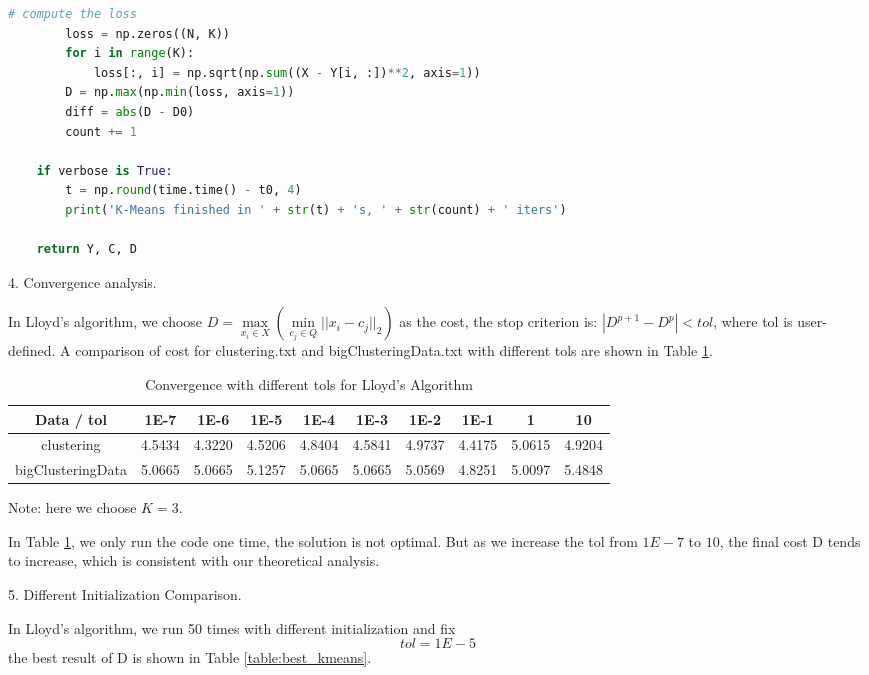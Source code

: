 \begin{description}
\begin{description}
\begin{lstlisting}[language=Python, caption={K-Means Algorithm Python Code}]
        # compute the loss
        loss = np.zeros((N, K))
        for i in range(K):
            loss[:, i] = np.sqrt(np.sum((X - Y[i, :])**2, axis=1))
        D = np.max(np.min(loss, axis=1))
        diff = abs(D - D0)
        count += 1

    if verbose is True:
        t = np.round(time.time() - t0, 4)
        print('K-Means finished in ' + str(t) + 's, ' + str(count) + ' iters')

    return Y, C, D
\end{lstlisting}

\item{4.} Convergence analysis.

In Lloyd's algorithm, we choose $D = \underset{x_i \in X}{\max}( \underset{c_j \in Q}{\min}{||x_i - c_j||_2})$ as the cost, the stop criterion is: $|D^{p+1} - D^{p}| < tol$, where tol is user-defined. A comparison of cost for clustering.txt and bigClusteringData.txt with different tols are shown in Table \ref{table:tol}.

\begin{table}[H]
	\centering
	\caption{Convergence with different tols for Lloyd's Algorithm}
	\label{table:tol}	
	\begin{tabular}{ c | c | c | c | c | c | c | c | c | c}
		\hline \hline
		Data / tol   & 1E-7    & 1E-6    & 1E-5     & 1E-4    & 1E-3    & 1E-2    & 1E-1    & 1    & 10 \\[0.1cm]
		\hline
	clustering	       & 4.5434 & 4.3220    & 4.5206    & 4.8404    & 4.5841    & 4.9737 & 4.4175 & 5.0615 & 4.9204 \\[0.1cm]
bigClusteringData & 5.0665 & 5.0665    & 5.1257    & 5.0665    & 5.0665    & 5.0569 & 4.8251 & 5.0097 & 5.4848 \\[0.1cm]
		\hline	
	\end{tabular}
\end{table}
Note: here we choose $K = 3$.

In Table \ref{table:tol}, we only run the code one time, the solution is not optimal. But as we increase the tol from $1E-7$ to $10$, the final cost D tends to increase, which is consistent with our theoretical analysis.

\item{5.} Different Initialization Comparison.

In Lloyd's algorithm, we run 50 times with different initialization and fix $$tol = 1E-5$$
the best result of D is shown in Table \ref{table:best_kmeans}.


\end{description}
\end{description}
